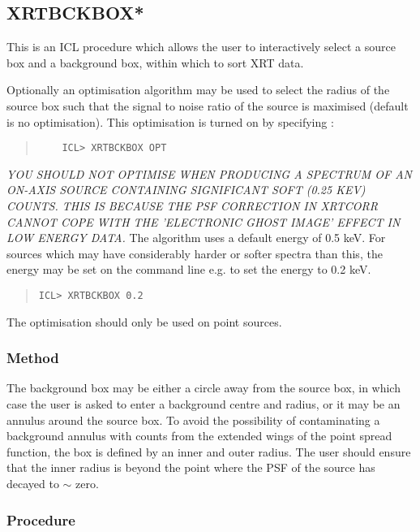 \documentclass{book}
\renewcommand{\_}{{\tt\char'137}}     %
\begin{document}
\subsection{XRTBCKBOX*}
This is an ICL procedure which allows the user to interactively select
a source box and a background box, within which to sort XRT data.

Optionally an optimisation algorithm may be used to
select the radius of the source box such that the signal to noise ratio
of the source is maximised (default is no optimisation).
This optimisation is turned on by specifying :

\begin{quote}\begin{verbatim}
    ICL> XRTBCKBOX OPT
\end{verbatim}\end{quote}
{\em YOU SHOULD NOT OPTIMISE WHEN PRODUCING A SPECTRUM OF
AN ON-AXIS SOURCE CONTAINING SIGNIFICANT SOFT (0.25 KEV) COUNTS.
THIS IS BECAUSE THE PSF CORRECTION IN XRTCORR CANNOT COPE WITH THE
'ELECTRONIC GHOST IMAGE' EFFECT IN LOW ENERGY DATA.}
The algorithm uses a default energy of 0.5 keV. For sources which may have
considerably harder or softer spectra than this, the energy may be set
on the command line e.g. to set the energy to 0.2 keV.

\begin{quote}\begin{verbatim}
ICL> XRTBCKBOX 0.2
\end{verbatim}\end{quote}
The optimisation should only be used on point sources.

\subsubsection{Method}
The background box may be either a circle away from the source box,
in which case the user is asked to enter a background centre and
radius, or it may be an annulus around the source box. To avoid the
possibility of contaminating a background annulus with counts from
the extended wings of the point spread function, the box is defined
by an inner and outer radius. The user should ensure that the inner
radius is beyond the point where the PSF of the source has decayed to
$\sim$ zero.

\subsubsection{Procedure}
\end{document}

